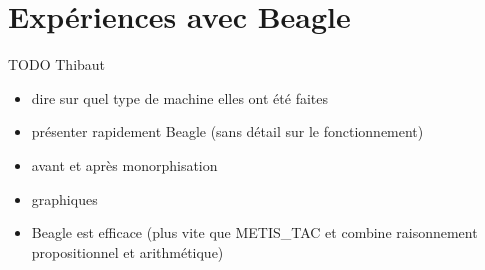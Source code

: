 \section{Expériences avec Beagle}

TODO Thibaut


\begin{itemize}
\item dire sur quel type de machine elles ont été faites
\item présenter rapidement Beagle (sans détail sur le fonctionnement)
\item avant et après monorphisation
\item graphiques
\item Beagle est efficace (plus vite que METIS\_TAC et combine
  raisonnement propositionnel et arithmétique)
\end{itemize}
